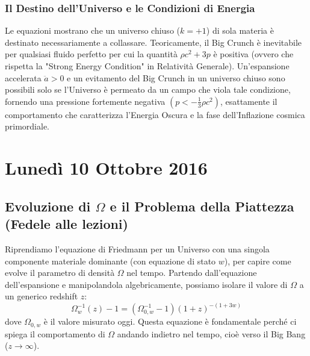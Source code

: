 \documentclass[11pt,a4paper]{report}
\begin{document}
\subsection{Il Destino dell'Universo e le Condizioni di Energia}
Le equazioni mostrano che un universo chiuso ($k=+1$) di sola materia è destinato necessariamente a collassare. Teoricamente, il Big Crunch è inevitabile per qualsiasi fluido perfetto per cui la quantità $\rho c^2 + 3p$ è positiva (ovvero che rispetta la "Strong Energy Condition" in Relatività Generale).
Un'espansione accelerata $\ddot{a} > 0$ e un evitamento del Big Crunch in un universo chiuso sono possibili solo se l'Universo è permeato da un campo che viola tale condizione, fornendo una pressione fortemente negativa $\left( p < -\frac{1}{3}\rho c^2 \right)$, esattamente il comportamento che caratterizza l'Energia Oscura e la fase dell'Inflazione cosmica primordiale.

\chapter{Lunedì 10 Ottobre 2016}

\section{Evoluzione di $\Omega$ e il Problema della Piattezza (Fedele alle lezioni)}

Riprendiamo l'equazione di Friedmann per un Universo con una singola componente materiale dominante (con equazione di stato $w$), per capire come evolve il parametro di densità $\Omega$ nel tempo. Partendo dall'equazione dell'espansione e manipolandola algebricamente, possiamo isolare il valore di $\Omega$ a un generico redshift $z$:
\begin{equation}
\Omega_w^{-1}(z) - 1 = (\Omega_{0,w}^{-1} - 1)(1+z)^{-(1+3w)}
\end{equation}
dove $\Omega_{0,w}$ è il valore misurato oggi. Questa equazione è fondamentale perché ci spiega il comportamento di $\Omega$ andando indietro nel tempo, cioè verso il Big Bang ($z \to \infty$).
\end{document}
